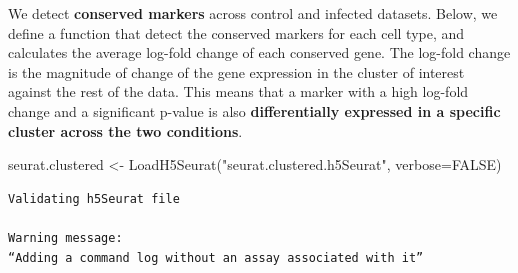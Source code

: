\documentclass[
  letterpaper,
  DIV=11,
  numbers=noendperiod]{scrartcl}
\newenvironment{Shaded}{\begin{snugshade}}{\end{snugshade}}
\newcommand{\AttributeTok}[1]{\textcolor[rgb]{0.49,0.56,0.16}{#1}}
\newcommand{\ConstantTok}[1]{\textcolor[rgb]{0.53,0.00,0.00}{#1}}
\newcommand{\FunctionTok}[1]{\textcolor[rgb]{0.02,0.16,0.49}{#1}}
\newcommand{\NormalTok}[1]{\textcolor[rgb]{0.00,0.44,0.13}{#1}}
\newcommand{\OtherTok}[1]{\textcolor[rgb]{0.00,0.44,0.13}{#1}}
\newcommand{\StringTok}[1]{\textcolor[rgb]{0.25,0.44,0.63}{#1}}
\begin{document}
We detect \textbf{conserved markers} across control and infected
datasets. Below, we define a function that detect the conserved markers
for each cell type, and calculates the average log-fold change of each
conserved gene. The log-fold change is the magnitude of change of the
gene expression in the cluster of interest against the rest of the data.
This means that a marker with a high log-fold change and a significant
p-value is also \textbf{differentially expressed in a specific cluster
across the two conditions}.

\begin{Shaded}
\begin{Highlighting}[]
\NormalTok{seurat.clustered }\OtherTok{\textless{}{-}} \FunctionTok{LoadH5Seurat}\NormalTok{(}\StringTok{"seurat.clustered.h5Seurat"}\NormalTok{, }\AttributeTok{verbose=}\ConstantTok{FALSE}\NormalTok{)}
\end{Highlighting}
\end{Shaded}

\begin{verbatim}
Validating h5Seurat file

Warning message:
“Adding a command log without an assay associated with it”
\end{verbatim}
\end{document}
